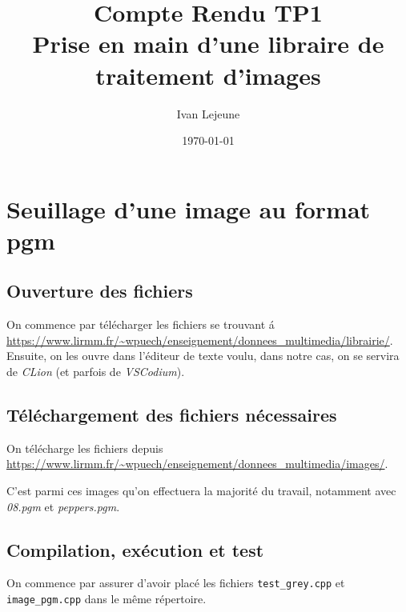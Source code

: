\documentclass[french,a4paper,10pt]{article}
\title{Compte Rendu TP1\\Prise en main d'une libraire de traitement d'images}
\author{Ivan Lejeune}
\date{\today}
\begin{document}
	\maketitle

	\section{Seuillage d'une image au format pgm}\label{sec:1}

	\subsection{Ouverture des fichiers}\label{subsec:1.1}
	On commence par t\'el\'echarger les fichiers se trouvant \'a
	\url{https://www.lirmm.fr/~wpuech/enseignement/donnees_multimedia/librairie/}.
	Ensuite, on les ouvre dans l'\'editeur de texte voulu, dans notre cas, on se servira de \emph{CLion}
	(et parfois de \emph{VSCodium}).
	
	\subsection{Téléchargement des fichiers nécessaires}\label{subsec:1.2}

	On t\'el\'echarge les fichiers depuis \url{https://www.lirmm.fr/~wpuech/enseignement/donnees_multimedia/images/}.

	C'est parmi ces images qu'on effectuera la majorit\'e du travail, notamment avec \emph{08.pgm} et \emph{peppers.pgm}.

	\subsection{Compilation, ex\'ecution et test}\label{subsec:1.3}

	On commence par assurer d'avoir plac\'e les fichiers \texttt{test\_grey.cpp} et \texttt{image\_pgm.cpp} dans le
	m\^eme r\'epertoire.
\end{document}
